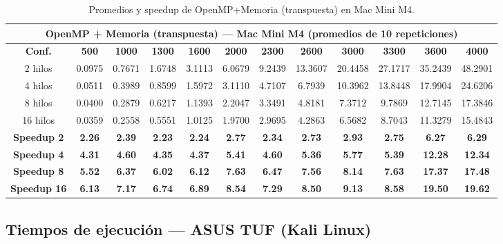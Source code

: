 \documentclass{article}
\begin{document}
\begin{table}[H]
\centering
\tiny
\begin{tabular}{|c|c|c|c|c|c|c|c|c|c|c|c|}
\hline
\multicolumn{12}{|c|}{\textbf{OpenMP + Memoria (transpuesta) --- Mac Mini M4 (promedios de 10 repeticiones)}} \\
\hline
\textbf{Conf.} & \textbf{500} & \textbf{1000} & \textbf{1300} & \textbf{1600} & \textbf{2000} & \textbf{2300} & \textbf{2600} & \textbf{3000} & \textbf{3300} & \textbf{3600} & \textbf{4000} \\
\hline
2 hilos & 0.0975 & 0.7671 & 1.6748 & 3.1113 & 6.0679 & 9.2439 & 13.3607 & 20.4458 & 27.1717 & 35.2439 & 48.2901 \\
4 hilos & 0.0511 & 0.3989 & 0.8599 & 1.5972 & 3.1110 & 4.7107 & 6.7939 & 10.3962 & 13.8448 & 17.9904 & 24.6206 \\
8 hilos & 0.0400 & 0.2879 & 0.6217 & 1.1393 & 2.2047 & 3.3491 & 4.8181 & 7.3712 & 9.7869 & 12.7145 & 17.3846 \\
16 hilos & 0.0359 & 0.2558 & 0.5551 & 1.0125 & 1.9700 & 2.9695 & 4.2863 & 6.5682 & 8.7043 & 11.3279 & 15.4843 \\
\hline
\textbf{Speedup 2} & \textbf{2.26} & \textbf{2.39} & \textbf{2.23} & \textbf{2.24} & \textbf{2.77} & \textbf{2.34} & \textbf{2.73} & \textbf{2.93} & \textbf{2.75} & \textbf{6.27} & \textbf{6.29} \\
\textbf{Speedup 4} & \textbf{4.31} & \textbf{4.60} & \textbf{4.35} & \textbf{4.37} & \textbf{5.41} & \textbf{4.60} & \textbf{5.36} & \textbf{5.77} & \textbf{5.39} & \textbf{12.28} & \textbf{12.34} \\
\textbf{Speedup 8} & \textbf{5.52} & \textbf{6.37} & \textbf{6.02} & \textbf{6.12} & \textbf{7.63} & \textbf{6.47} & \textbf{7.56} & \textbf{8.14} & \textbf{7.63} & \textbf{17.37} & \textbf{17.48} \\
\textbf{Speedup 16} & \textbf{6.13} & \textbf{7.17} & \textbf{6.74} & \textbf{6.89} & \textbf{8.54} & \textbf{7.29} & \textbf{8.50} & \textbf{9.13} & \textbf{8.58} & \textbf{19.50} & \textbf{19.62} \\
\hline
\end{tabular}
\caption{Promedios y speedup de OpenMP+Memoria (transpuesta) en Mac Mini M4.}
\label{tab:ompm_mac}
\end{table}

\subsection{Tiempos de ejecución --- ASUS TUF (Kali Linux)}
\end{document}
